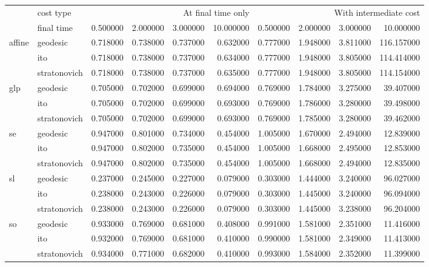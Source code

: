\begin{tabular}{llrrrrrrrr}
\toprule
 & cost type & \multicolumn{4}{r}{At final time only} & \multicolumn{4}{r}{With intermediate cost} \\
 & final time & 0.500000 & 2.000000 & 3.000000 & 10.000000 & 0.500000 & 2.000000 & 3.000000 & 10.000000 \\
\midrule
\multirow[t]{3}{*}{affine} & geodesic & 0.718000 & 0.738000 & 0.737000 & 0.632000 & 0.777000 & 1.948000 & 3.811000 & 116.157000 \\
 & ito & 0.718000 & 0.738000 & 0.737000 & 0.634000 & 0.777000 & 1.948000 & 3.805000 & 114.414000 \\
 & stratonovich & 0.718000 & 0.738000 & 0.737000 & 0.635000 & 0.777000 & 1.948000 & 3.805000 & 114.154000 \\
\cline{1-10}
\multirow[t]{3}{*}{glp} & geodesic & 0.705000 & 0.702000 & 0.699000 & 0.694000 & 0.769000 & 1.784000 & 3.275000 & 39.407000 \\
 & ito & 0.705000 & 0.702000 & 0.699000 & 0.693000 & 0.769000 & 1.786000 & 3.280000 & 39.498000 \\
 & stratonovich & 0.705000 & 0.702000 & 0.699000 & 0.693000 & 0.769000 & 1.785000 & 3.280000 & 39.462000 \\
\cline{1-10}
\multirow[t]{3}{*}{se} & geodesic & 0.947000 & 0.801000 & 0.734000 & 0.454000 & 1.005000 & 1.670000 & 2.494000 & 12.839000 \\
 & ito & 0.947000 & 0.802000 & 0.735000 & 0.454000 & 1.005000 & 1.668000 & 2.495000 & 12.853000 \\
 & stratonovich & 0.947000 & 0.802000 & 0.735000 & 0.454000 & 1.005000 & 1.668000 & 2.494000 & 12.835000 \\
\cline{1-10}
\multirow[t]{3}{*}{sl} & geodesic & 0.237000 & 0.245000 & 0.227000 & 0.079000 & 0.303000 & 1.444000 & 3.240000 & 96.027000 \\
 & ito & 0.238000 & 0.243000 & 0.226000 & 0.079000 & 0.303000 & 1.445000 & 3.240000 & 96.094000 \\
 & stratonovich & 0.238000 & 0.243000 & 0.226000 & 0.079000 & 0.303000 & 1.445000 & 3.238000 & 96.204000 \\
\cline{1-10}
\multirow[t]{3}{*}{so} & geodesic & 0.933000 & 0.769000 & 0.681000 & 0.408000 & 0.991000 & 1.581000 & 2.351000 & 11.416000 \\
 & ito & 0.932000 & 0.769000 & 0.681000 & 0.410000 & 0.990000 & 1.581000 & 2.349000 & 11.413000 \\
 & stratonovich & 0.934000 & 0.771000 & 0.682000 & 0.410000 & 0.993000 & 1.584000 & 2.352000 & 11.399000 \\

\end{tabular}
